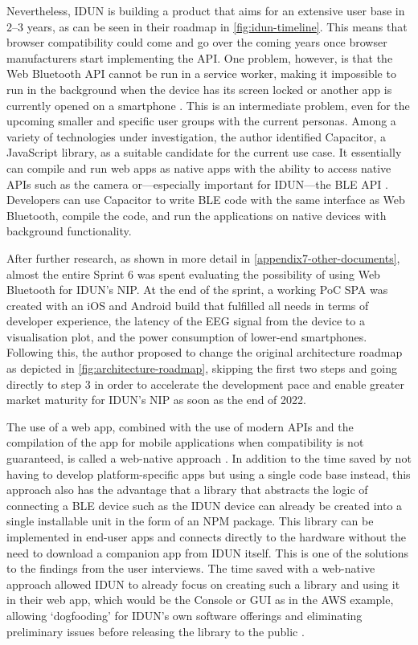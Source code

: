 Nevertheless, IDUN is building a product that aims for an extensive user base in 2–3 years, as can be seen in their roadmap in \autoref{fig:idun-timeline}. This means that browser compatibility could come and go over the coming years once browser manufacturers start implementing the API. One problem, however, is that the Web Bluetooth API cannot be run in a service worker, making it impossible to run in the background when the device has its screen locked or another app is currently opened on a smartphone  \citep{webbluetoothcg_service_2018}. This is an intermediate problem, even for the upcoming smaller and specific user groups with the current personas. Among a variety of technologies under investigation, the author identified Capacitor, a JavaScript library, as a suitable candidate for the current use case. It essentially can compile and run web apps as native apps with the ability to access native APIs \citep{ionic_capacitor_nodate} such as the camera or—especially important for IDUN—the BLE API \citep{capacitor-community_capacitor-communitybluetooth-_2022}. Developers can use Capacitor to write BLE code with the same interface as Web Bluetooth, compile the code, and run the applications on native devices with background functionality.

After further research, as shown in more detail in \autoref{appendix7-other-documents}, almost the entire Sprint 6 was spent evaluating the possibility of using Web Bluetooth for IDUN’s NIP. At the end of the sprint, a working PoC SPA was created with an iOS and Android build that fulfilled all needs in terms of developer experience, the latency of the EEG signal from the device to a visualisation plot, and the power consumption of lower-end smartphones. Following this, the author proposed to change the original architecture roadmap as depicted in \autoref{fig:architecture-roadmap}, skipping the first two steps and going directly to step 3 in order to accelerate the development pace and enable greater market maturity for IDUN’s NIP as soon as the end of 2022.

The use of a web app, combined with the use of modern APIs and the compilation of the app for mobile applications when compatibility is not guaranteed, is called a web-native approach \citep{ionic_web_nodate}. In addition to the time saved by not having to develop platform-specific apps but using a single code base instead, this approach also has the advantage that a library that abstracts the logic of connecting a BLE device such as the IDUN device can already be created into a single installable unit in the form of an NPM package. This library can be implemented in end-user apps and connects directly to the hardware without the need to download a companion app from IDUN itself. This is one of the solutions to the findings from the user interviews. The time saved with a web-native approach allowed IDUN to already focus on creating such a library and using it in their web app, which would be the Console or GUI as in the AWS example, allowing ‘dogfooding’ for IDUN’s own software offerings and eliminating preliminary issues before releasing the library to the public \citep{techopedia_what_2016}.

